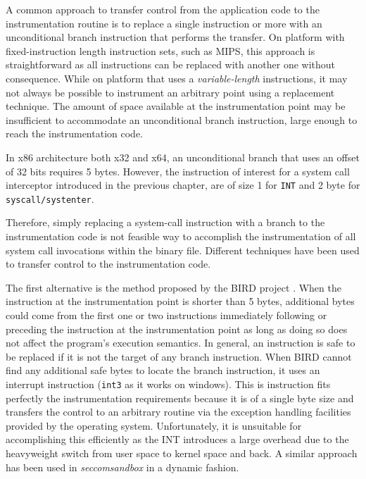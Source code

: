 
A common approach to transfer control from the application code to the instrumentation routine is to replace a single instruction or more with an unconditional branch instruction that performs the transfer. On platform with fixed-instruction length instruction sets, such as MIPS, this approach is straightforward as all instructions can be replaced with another one without consequence. While on platform that uses a \emph{variable-length} instructions, it may not always be possible to instrument an arbitrary point using a replacement technique. The amount of space available at the instrumentation point may be insufficient to accommodate an unconditional branch instruction, large enough to reach the instrumentation code. 

In x86 architecture both x32 and x64, an unconditional branch that uses an offset of 32 bits requires 5 bytes. However, the instruction of interest for a system call interceptor introduced in the previous chapter, are of size 1 for \lstinline$INT$ and 2 byte for \lstinline$syscall/systenter$.

Therefore, simply replacing a system-call instruction with a branch to the instrumentation code is not feasible way to accomplish the instrumentation of all system call invocations  within the binary file. Different techniques have been used to transfer control to the instrumentation code. 

The first alternative is the method proposed by the BIRD project \cite{BIRD}. When the instruction at the instrumentation point is shorter than 5 bytes, additional bytes could come from the first one or two instructions immediately following or preceding the instruction at the instrumentation point as long as doing so does not affect the program’s execution semantics. In general, an instruction is safe to be replaced if it is not the target of any branch instruction. When BIRD cannot find any additional safe bytes to locate the branch instruction, it uses an interrupt instruction (\lstinline$int3$ as it works on windows). This is instruction fits perfectly the instrumentation requirements because it is of a single byte size and transfers the control to an arbitrary routine via the exception handling facilities provided by the operating system. Unfortunately, it is unsuitable for accomplishing this efficiently as the INT introduces a large overhead due to the  heavyweight switch from user space  to kernel space  and back. A similar approach has been used in \emph{seccomsandbox} in a dynamic fashion.

